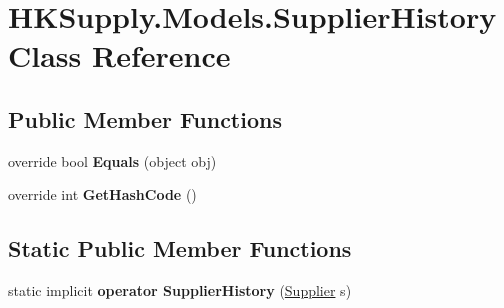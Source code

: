 \hypertarget{class_h_k_supply_1_1_models_1_1_supplier_history}{}\section{H\+K\+Supply.\+Models.\+Supplier\+History Class Reference}
\label{class_h_k_supply_1_1_models_1_1_supplier_history}
\subsection*{Public Member Functions}
\begin{DoxyCompactItemize}
\item 
\mbox{\label{class_h_k_supply_1_1_models_1_1_supplier_history_a8d2399aa38d8a0680878200b257b609d}} 
override bool {\bfseries Equals} (object obj)
\item 
\mbox{\label{class_h_k_supply_1_1_models_1_1_supplier_history_a51a4cb1261602017493e723c90b6b3f7}} 
override int {\bfseries Get\+Hash\+Code} ()
\end{DoxyCompactItemize}
\subsection*{Static Public Member Functions}
\begin{DoxyCompactItemize}
\item 
\mbox{\label{class_h_k_supply_1_1_models_1_1_supplier_history_a661b8838c54d3dfd38d5698cbb8eb204}} 
static implicit {\bfseries operator Supplier\+History} (\mbox{\hyperlink{class_h_k_supply_1_1_models_1_1_supplier}{Supplier}} s)
\end{DoxyCompactItemize}
